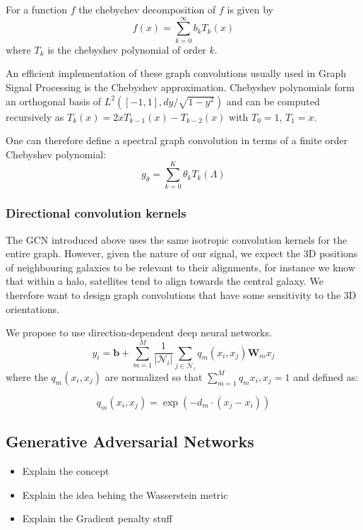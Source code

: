 \documentclass[a4paper,fleqn,usenatbib]{mnras}
\begin{document}
For a function $f$ the chebychev decomposition of $f$ is given by 
\begin{equation}
	f(x) = \sum\limits_{k=0}^{\infty} b_{k} T_k(x)
\end{equation}
where $T_k$ is the  chebyshev polynomial of order $k$.

An efficient implementation of these graph convolutions usually used in Graph Signal Processing is the Chebyshev approximation. Chebyshev polynomials form an orthogonal basis of $L^2([-1,1], dy/\sqrt{1 - y^2})$ and can be computed recursively as $T_k(x) = 2x T_{k-1}(x) - T_{k-2}(x)$ with $T_0 =1$, $T_1 = x$.  

One can therefore define a spectral graph convolution in terms of a finite order Chebyshev polynomial:
\begin{equation}
	g_\theta = \sum_{k=0}^K \theta_k T_k(\Lambda)
\end{equation}

\subsubsection{Directional convolution kernels}

The GCN introduced above uses the same isotropic convolution kernels for the entire graph. However, given the  nature of our signal, we expect the 3D positions of neighbouring galaxies to be relevant to their alignments, for instance we know that within a halo, satellites tend to align towards the central galaxy. We therefore want to design graph convolutions that have some sensitivity to the 3D orientations. 

We propose to use  direction-dependent  deep neural networks.
\begin{equation}
	y_i=  \mathbf{b} +  \sum\limits_{m=1}^{M} \frac{1}{|\mathcal{N}_i|} \sum_{j \in \mathcal{N}_i} q_m(x_i, x_j) \mathbf{W}_m x_j 
\end{equation}
where the  $q_m(x_i, x_j)$ are normalized so that $\sum_{m=1}^{M} q_m{x_i, x_j} = 1$ and defined as:

\begin{equation}
		q_m(x_i, x_j) = \exp(- d_m \cdot (x_j - x_i))
\end{equation}


\subsection{Generative Adversarial Networks}

\begin{itemize}
	\item Explain the concept
	\item Explain the idea behing the Wasserstein metric
	\item Explain  the  Gradient penalty stuff
\end{itemize}
\end{document}

